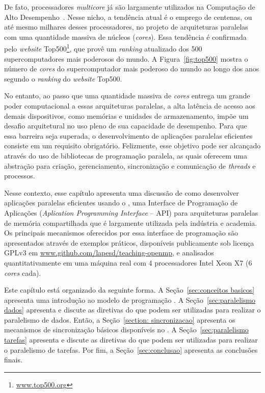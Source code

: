 \documentclass{SBCbookchapter}
\begin{document}
	De fato, processadores \textit{multicore} já são largamente
	utilizados na Computação de Alto Desempenho~\cite{Asanovic09}.
	Nesse nicho, a tendência atual é o emprego de centenas, ou até mesmo
	milhares desses processadores, no projeto de arquiteturas paralelas
	com uma quantidade massiva de núcleos (\textit{cores}). Essa
	tendência é confirmada pelo \textit{website}
	Top500\footnote{\url{www.top500.org}}, que provê um
	\textit{ranking} atualizado	dos 500 supercomputadores mais poderosos
	do mundo. A Figura~\ref{fig:top500} mostra o número de \textit{cores}
	do supercomputador mais poderoso do mundo ao longo dos anos 
	segundo o \textit{ranking} do \textit{website} Top500.
		
	No entanto, ao passo que uma quantidade massiva de \textit{cores}
	entrega um grande poder computacional a essas arquiteturas
	paralelas, a alta latência de acesso aos demais dispositivos, como
	memórias e unidades de armazenamento, impõe um desafio arquitetural
	no uso pleno de sua capacidade de desempenho. Para que essa barreira
	seja superada, o desenvolvimento de aplicações paralelas eficientes
	consiste em um requisito obrigatório. Felizmente, esse objetivo pode ser
	alcançado através do uso de bibliotecas de programação paralela, as
	quais oferecem uma abstração para criação, gerenciamento,
	sincronização e comunicação de \textit{threads} e processos.
	
	Nesse contexto, esse capítulo apresenta uma discussão de como
	desenvolver aplicações paralelas eficientes usando o \openmp, uma
	Interface de Programação de Aplicações (\textit{Aplication Programming
	Interface} -- API) para arquiteturas paralelas de memória compartilhada
	que é largamente utilizada pela indústria e academia. Os principais
	mecanismos oferecidos por essa interface de programação são apresentados
	através de exemplos práticos, disponíveis publicamente sob licença
	GPLv3 em \url{www.github.com/lapesd/teaching-openmp}, e analisados
	quantitativamente em uma máquina real com 4 processadores Intel Xeon
	X7 (6 \textit{cores} cada).
	
	Este capítulo está organizado da seguinte forma. A
	Seção~\ref{sec:conceitos basicos} apresenta uma introdução ao modelo
	de programação \openmp.  A Seção~\ref{sec:paralelismo dados}
	apresenta e discute as diretivas do \openmp que podem ser utilizadas
	para realizar o paralelismo de dados. Então, a Seção~\ref{section:
	sincronizacao} apresenta os mecanismos de sincronização básicos
	disponíveis no \openmp. A Seção~\ref{sec:paralelismo tarefas}
	apresenta e discute as diretivas do \openmp que podem ser utilizadas
	para realizar o paralelismo de tarefas. Por fim, a Seção~\ref{sec:conclusao}
	apresenta as conclusões finais.
\end{document}
